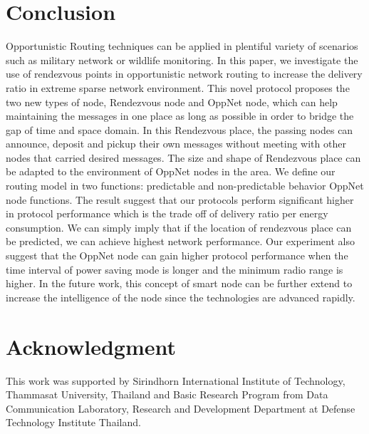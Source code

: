 \documentclass[conference]{IEEEtran}
\begin{document}
 

\section{Conclusion}
Opportunistic Routing techniques can be applied in  plentiful variety of scenarios such as military network or wildlife monitoring. 
In this paper, we investigate the use of rendezvous points in opportunistic network routing to increase the delivery ratio in extreme sparse network environment.
This novel protocol proposes the two new types of node, Rendezvous node and OppNet node, which can help maintaining the messages in one place as long as possible in order to bridge the gap of time and space domain.
In this Rendezvous place, the passing nodes can announce, deposit and pickup their own messages without meeting with other nodes that carried desired messages.
The size and shape of  Rendezvous place can be adapted to the environment of OppNet nodes in the area.
We define our routing model in two functions: predictable  and non-predictable behavior OppNet node functions.
The result suggest that our protocols perform significant higher in protocol performance which is the trade off of delivery ratio per energy consumption.
We can simply imply that if the location of rendezvous place can be predicted, we can achieve highest network performance.
Our experiment also suggest that the OppNet node can gain higher protocol performance when the time interval of power saving mode is longer and the minimum radio range is higher.
In the future work, this concept of smart node can be further extend to increase the intelligence of the node since the technologies are advanced rapidly.


\section*{Acknowledgment}
This work was supported by Sirindhorn International Institute of Technology, Thammasat University, Thailand and Basic Research Program from Data Communication Laboratory, Research and Development Department at Defense Technology Institute Thailand.



\end{document}
